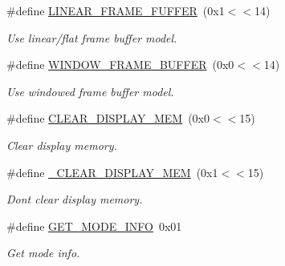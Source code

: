 \begin{DoxyCompactItemize}
\mbox{\label{group__videocard__macros_ga521687207250d1c605e9c71db9b29d57}} 
\#define \hyperlink{group__videocard__macros_ga521687207250d1c605e9c71db9b29d57}{L\+I\+N\+E\+A\+R\+\_\+\+F\+R\+A\+M\+E\+\_\+\+F\+U\+F\+F\+ER}~(0x1$<$$<$14)
\begin{DoxyCompactList}\small\item\em Use linear/flat frame buffer model. \end{DoxyCompactList}\item 
\mbox{\label{group__videocard__macros_ga3116aca2b94f54774ac1bca7883f9cd2}} 
\#define \hyperlink{group__videocard__macros_ga3116aca2b94f54774ac1bca7883f9cd2}{W\+I\+N\+D\+O\+W\+\_\+\+F\+R\+A\+M\+E\+\_\+\+B\+U\+F\+F\+ER}~(0x0$<$$<$14)
\begin{DoxyCompactList}\small\item\em Use windowed frame buffer model. \end{DoxyCompactList}\item 
\mbox{\label{group__videocard__macros_ga26361bc2a62ca1a8549e75e74985d1c3}} 
\#define \hyperlink{group__videocard__macros_ga26361bc2a62ca1a8549e75e74985d1c3}{C\+L\+E\+A\+R\+\_\+\+D\+I\+S\+P\+L\+A\+Y\+\_\+\+M\+EM}~(0x0$<$$<$15)
\begin{DoxyCompactList}\small\item\em Clear display memory. \end{DoxyCompactList}\item 
\mbox{\label{group__videocard__macros_gad93180c50436a3f306542660ad5a6425}} 
\#define \hyperlink{group__videocard__macros_gad93180c50436a3f306542660ad5a6425}{\+\_\+\+C\+L\+E\+A\+R\+\_\+\+D\+I\+S\+P\+L\+A\+Y\+\_\+\+M\+EM}~(0x1$<$$<$15)
\begin{DoxyCompactList}\small\item\em Don\textquotesingle{}t clear display memory. \end{DoxyCompactList}\item 
\mbox{\label{group__videocard__macros_ga0240cce19268c3ac2de090e8f718b89a}} 
\#define \hyperlink{group__videocard__macros_ga0240cce19268c3ac2de090e8f718b89a}{G\+E\+T\+\_\+\+M\+O\+D\+E\+\_\+\+I\+N\+FO}~0x01
\begin{DoxyCompactList}\small\item\em Get mode info. \end{DoxyCompactList}\item 

\end{DoxyCompactItemize}
